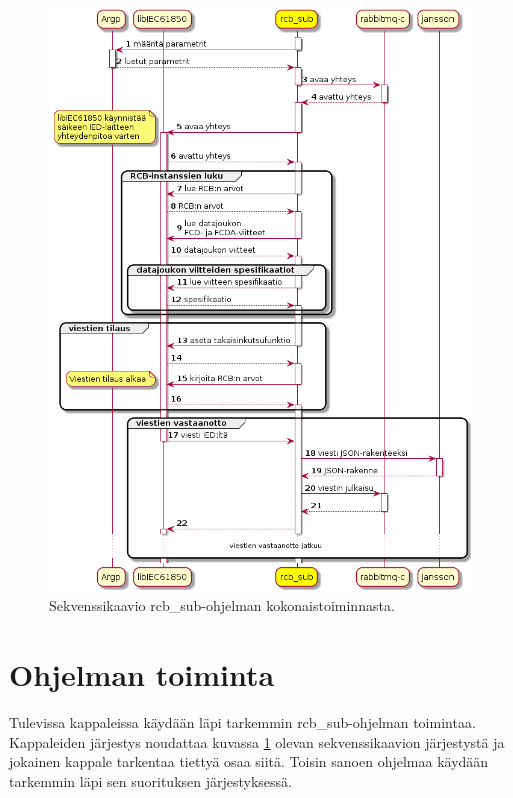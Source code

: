 \begin{figure}[ht!]
	\includegraphics[width=1\textwidth]{pictures/rcb-sub-general-sd.png}
	\caption{Sekvenssikaavio rcb\_sub-ohjelman kokonaistoiminnasta.}
	\label{fig:rcb-sub-sekvenssikaavio}
\end{figure}


\section{Ohjelman toiminta}
\label{rcb-sub-toiminta}
Tulevissa kappaleissa käydään läpi tarkemmin rcb\_sub-ohjelman toimintaa. Kappaleiden järjestys noudattaa kuvassa \ref{fig:rcb-sub-sekvenssikaavio} olevan sekvenssikaavion järjestystä ja jokainen kappale tarkentaa tiettyä osaa siitä. Toisin sanoen ohjelmaa käydään tarkemmin läpi sen suorituksen järjestyksessä.


